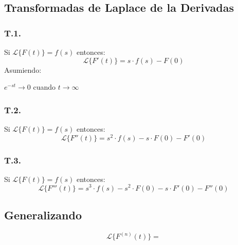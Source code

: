 \subsection*{Transformadas de Laplace de la Derivadas}
\subsubsection*{T.1.}
Si $\mathscr{L} \lbrace F(t) \rbrace = f(s)$ entonces:
$$\mathscr{L} \lbrace F'(t) \rbrace = s\cdot f(s) - F(0)$$
Asumiendo:
\begin{center}
$e^{-st} \to 0$ cuando $t\to\infty$
\end{center}
\subsubsection*{T.2.}
Si $\mathscr{L} \lbrace F(t) \rbrace = f(s)$ entonces:
$$\mathscr{L} \lbrace F''(t) \rbrace = s^2\cdot f(s) - s\cdot F(0)-F'(0)$$
\subsubsection*{T.3.}
Si $\mathscr{L} \lbrace F(t) \rbrace = f(s)$ entonces:
$$\mathscr{L} \lbrace F'''(t) \rbrace = s^3\cdot f(s) - s^2 \cdot F(0)-s\cdot F'(0)-F''(0)$$
\subsection*{Generalizando}
$$\mathscr{L} \lbrace F^{(n)}(t) \rbrace = $$